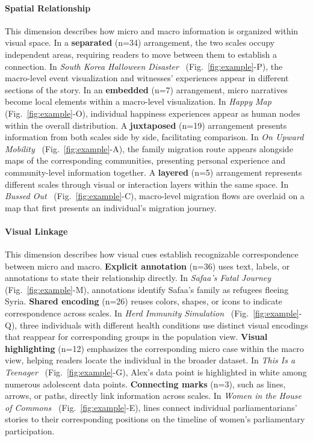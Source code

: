 \paragraph{\textbf{\textcolor{imp}{Spatial Relationship}}}

This dimension describes how micro and macro information is organized within visual space. In a \textbf{separated} (n=34) arrangement, the two scales occupy independent areas, requiring readers to move between them to establish a connection. In \textit{South Korea Halloween Disaster}~\cite{smith2022seoul} (Fig.~\ref{fig:example}-P), the macro-level event visualization and witnesses’ experiences appear in different sections of the story. In an \textbf{embedded} (n=7) arrangement, micro narratives become local elements within a macro-level visualization. In \textit{Happy Map}~\cite{happymap2026} (Fig.~\ref{fig:example}-O), individual happiness experiences appear as human nodes within the overall distribution. A \textbf{juxtaposed} (n=19) arrangement presents information from both scales side by side, facilitating comparison. In \textit{On Upward Mobility}~\cite{williams2022upwardmobility} (Fig.~\ref{fig:example}-A), the family migration route appears alongside maps of the corresponding communities, presenting personal experience and community-level information together. A \textbf{layered} (n=5) arrangement represents different scales through visual or interaction layers within the same space. In \textit{Bussed Out}~\cite{gee2017bussed} (Fig.~\ref{fig:example}-C), macro-level migration flows are overlaid on a map that first presents an individual’s migration journey.

\paragraph{\textbf{\textcolor{imp}{Visual Linkage}}}

This dimension describes how visual cues establish recognizable correspondence between micro and macro. \textbf{Explicit annotation} (n=36) uses text, labels, or annotations to state their relationship directly. In \textit{Safaa’s Fatal Journey}~\cite{spencer2015safaa} (Fig.~\ref{fig:example}-M), annotations identify Safaa’s family as refugees fleeing Syria. \textbf{Shared encoding} (n=26) reuses colors, shapes, or icons to indicate correspondence across scales. In \textit{Herd Immunity Simulation}~\cite{stevens2020herd} (Fig.~\ref{fig:example}-Q), three individuals with different health conditions use distinct visual encodings that reappear for corresponding groups in the population view. \textbf{Visual highlighting} (n=12) emphasizes the corresponding micro case within the macro view, helping readers locate the individual in the broader dataset. In \textit{This Is a Teenager}~\cite{chang2024teenager} (Fig.~\ref{fig:example}-G), Alex’s data point is highlighted in white among numerous adolescent data points. \textbf{Connecting marks} (n=3), such as lines, arrows, or paths, directly link information across scales. In \textit{Women in the House of Commons}~\cite{dsouza2018women} (Fig.~\ref{fig:example}-E), lines connect individual parliamentarians’ stories to their corresponding positions on the timeline of women’s parliamentary participation.

